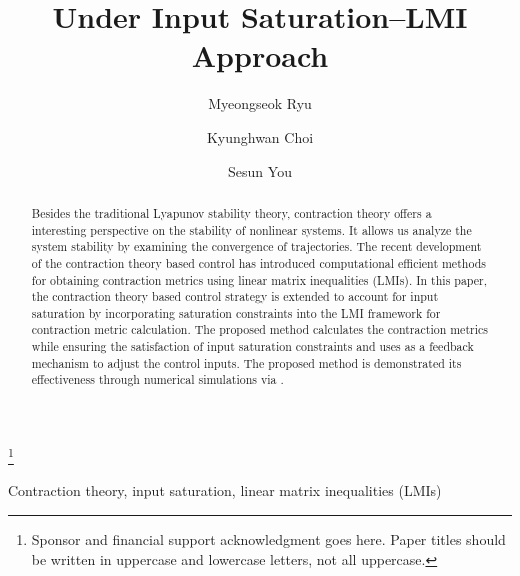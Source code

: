\documentclass{ifacconf}
\newcommand{\ctxt}[2]{{\color{#1}{#2}\color{black}}}
\newcommand{\cred}[1]{{\ctxt{awesome}{#1}}}
\newcommand{\cblue}[1]{{\ctxt{airforceblue}{#1}}}
\begin{document}
\begin{frontmatter}

\title{
   \cblue{Contraction Theory Based Control} Under Input Saturation–LMI Approach
} 

\thanks[footnoteinfo]{Sponsor and financial support acknowledgment
goes here. Paper titles should be written in uppercase and lowercase
letters, not all uppercase.}

\author[First]{Myeongseok Ryu} 
\author[First]{Kyunghwan Choi} 
\author[Second]{Sesun You}

\address[First]{
   Korea Advanced Institute of Science and Technology (KAIST), 
   Daejeon 34051, South Korea (e-mail: \{dding\_98,kh.choi\}@kaist.ac.kr)}
\address[Second]{
   Keimyung University, 
   Daegu 42601, South Korea (e-mail: yousesun@kmu.ac.kr)}

\begin{abstract}                %
   Besides the traditional Lyapunov stability theory, contraction theory offers a interesting perspective on the stability of nonlinear systems.
   It allows us analyze the system stability by examining the convergence of trajectories.
   The recent development of the contraction theory based control has introduced computational efficient methods for obtaining contraction metrics using linear matrix inequalities (LMIs).
   In this paper, the contraction theory based control strategy is extended to account for input saturation by incorporating saturation constraints into the LMI framework for contraction metric calculation.
   The proposed method calculates the contraction metrics while ensuring the satisfaction of input saturation constraints and uses as a feedback mechanism to adjust the control inputs.
   The proposed method is demonstrated its effectiveness through numerical simulations via \cred{Lorenz system}.
\end{abstract}

\begin{keyword}
   Contraction theory, input saturation, linear matrix inequalities (LMIs)
\end{keyword}

\end{frontmatter}
\end{document}
